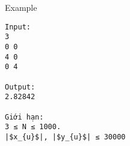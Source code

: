 Example
\begin{verbatim}
Input:
3
0 0
4 0
0 4

Output:
2.82842

Giới hạn:
3 ≤ N ≤ 1000. 
|$x_{u}$|, |$y_{u}$| ≤ 30000

\end{verbatim}